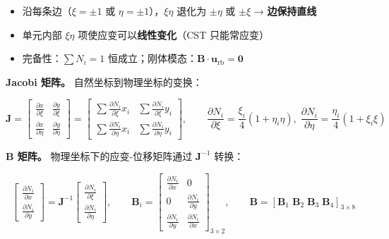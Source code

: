 \documentclass[12pt,a4paper]{ctexart}
\begin{document}
\begin{itemize}
  \item 沿每条边（$\xi=\pm1$ 或 $\eta=\pm1$），$\xi\eta$ 退化为 $\pm\eta$ 或 $\pm\xi$ → \textbf{边保持直线}
  \item 单元内部 $\xi\eta$ 项使应变可以\textbf{线性变化}（CST 只能常应变）
  \item 完备性：$\sum N_i = 1$ 恒成立；刚体模态：$\mathbf{B}\cdot\mathbf{u}_{\text{rb}} = \mathbf{0}$
\end{itemize}

\textbf{Jacobi 矩阵。} 自然坐标到物理坐标的变换：

\begin{equation}\label{eq:q4-jac}
\mathbf{J} = \begin{bmatrix}
\frac{\partial x}{\partial\xi} & \frac{\partial y}{\partial\xi} \\[4pt]
\frac{\partial x}{\partial\eta} & \frac{\partial y}{\partial\eta}
\end{bmatrix}
= \begin{bmatrix}
\sum\frac{\partial N_i}{\partial\xi}x_i & \sum\frac{\partial N_i}{\partial\xi}y_i \\[4pt]
\sum\frac{\partial N_i}{\partial\eta}x_i & \sum\frac{\partial N_i}{\partial\eta}y_i
\end{bmatrix},
\qquad
\frac{\partial N_i}{\partial\xi} = \frac{\xi_i}{4}(1+\eta_i\eta),\;
\frac{\partial N_i}{\partial\eta} = \frac{\eta_i}{4}(1+\xi_i\xi)
\end{equation}

\textbf{B 矩阵。} 物理坐标下的应变-位移矩阵通过 $\mathbf{J}^{-1}$ 转换：

\begin{equation}\label{eq:q4-B}
\begin{bmatrix}
\frac{\partial N_i}{\partial x} \\[4pt]
\frac{\partial N_i}{\partial y}
\end{bmatrix}
= \mathbf{J}^{-1}
\begin{bmatrix}
\frac{\partial N_i}{\partial\xi} \\[4pt]
\frac{\partial N_i}{\partial\eta}
\end{bmatrix},\qquad
\mathbf{B}_i = \begin{bmatrix}
\frac{\partial N_i}{\partial x} & 0 \\
0 & \frac{\partial N_i}{\partial y} \\[4pt]
\frac{\partial N_i}{\partial y} & \frac{\partial N_i}{\partial x}
\end{bmatrix}_{3\times 2},\qquad
\mathbf{B} = [\mathbf{B}_1\; \mathbf{B}_2\; \mathbf{B}_3\; \mathbf{B}_4]_{3\times 8}
\end{equation}
\end{document}

